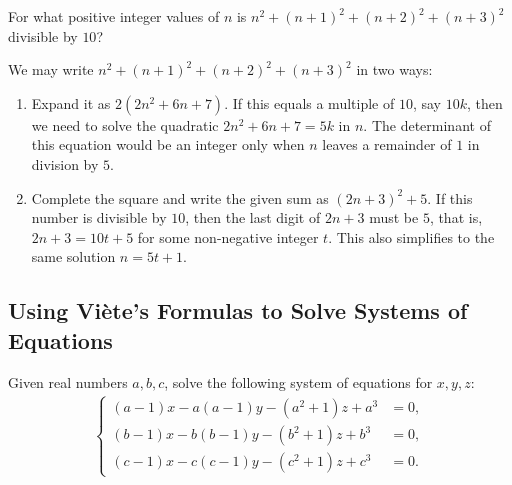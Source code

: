 \begin{question}
    For what positive integer values of $n$ is $n^2+(n+1)^2+(n+2)^2+(n+3)^2$ divisible by $10$?
\end{question}

\begin{solution}
    We may write $n^2+(n+1)^2+(n+2)^2+(n+3)^2$ in two ways:
    \begin{enumerate}
        \item Expand it as $2(2n^2+6n+7)$. If this equals a multiple of $10$, say $10k$, then we need to solve the quadratic $2n^2+6n+7=5k$ in $n$. The determinant of this equation would be an integer only when $n$ leaves a remainder of $1$ in division by $5$.
        \item Complete the square and write the given sum as $(2n+3)^2+5$. If this number is divisible by $10$, then the last digit of $2n+3$ must be $5$, that is, $2n+3=10t+5$ for some non-negative integer $t$. This also simplifies to the same solution $n=5t+1$.
    \end{enumerate}
\end{solution}

\subsection{Using Viète's Formulas to Solve Systems of Equations}

\begin{question}
Given real numbers $a,b,c$, solve the following system of equations for $x,y,z$:
    \begin{align*}
        \begin{cases}
            (a-1)x-a(a-1)y-(a^2+1)z+a^3 &= 0,\\(b-1)x-b(b-1)y-(b^2+1)z+b^3 &= 0,\\(c-1)x-c(c-1)y-(c^2+1)z+c^3 &= 0.
        \end{cases}
    \end{align*}
\end{question}

